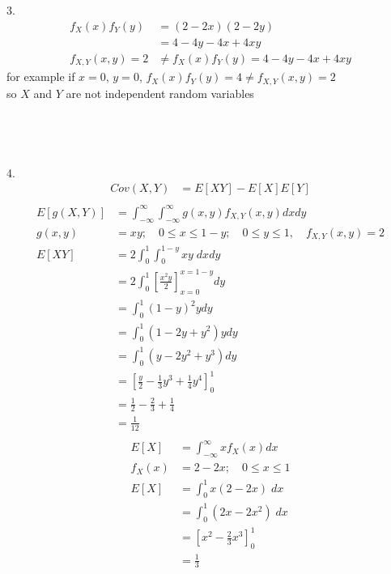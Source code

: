 \documentclass[12pt,border=4pt,multi]{article} %
\begin{document}
\leavevmode
\\
\\
\\
\\
\\
3.
\begin{align*}
f_{X}(x)f_{Y}(y) &= (2 - 2x)(2 - 2y)\\
&= 4 - 4y - 4x + 4xy\\
f_{X, Y}(x, y) = 2 &\not= f_{X}(x)f_{Y}(y) = 4 - 4y - 4x + 4xy
\end{align*}
for example if $x = 0$, $y = 0$, $f_{X}(x)f_{Y}(y) = 4 \not= f_{X, Y}(x, y) = 2$\\
so $X$ and $Y$ are not independent random variables\\
\\
\\
\\
\\
4.
\begin{align*}
Cov(X, Y) &= E[XY] - E[X]E[Y]\\
\end{align*}
\begin{align*}
E[g(X, Y)] &= \int_{-\infty}^{\infty} \int_{-\infty}^{\infty} g(x, y) f_{X, Y}(x, y) dx dy\\
g(x, y) &= xy;\quad 0 \leq x \leq 1 - y;\quad 0 \leq y \leq 1,\quad f_{X, Y}(x, y) = 2\\
E[XY] &= 2\int_{0}^{1} \int_{0}^{1 - y} xy\; dx dy\\
&= 2\int_{0}^{1} \left[\frac{x^2y}{2}\right]_{x = 0}^{x = 1 - y} dy\\
&= \int_{0}^{1} (1 - y)^2y dy\\
&= \int_{0}^{1} (1 - 2y + y^2)y dy\\
&= \int_{0}^{1} (y - 2y^2 + y^3) dy\\
&= \left[\frac{y}{2} - \frac{1}{3}y^3 + \frac{1}{4}y^4\right]_0^1\\
&= \frac{1}{2} - \frac{2}{3} + \frac{1}{4}\\
&= \frac{1}{12}\\
\end{align*}
\begin{align*}
E[X] &= \int_{-\infty}^{\infty} x f_X(x) dx\\
f_X(x) &= 2 - 2x;\quad 0 \leq x \leq 1\\
E[X] &= \int_{0}^{1} x(2 - 2x)\;dx\\
&= \int_{0}^{1} (2x - 2x^2)\;dx\\
&= \left[x^2 - \frac{2}{3}x^3\right]_0^1\\
&= \frac{1}{3}\\
\end{align*}
\end{document}
